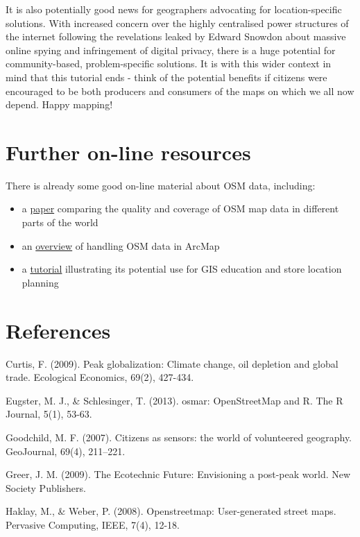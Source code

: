 \documentclass[]{article}
\begin{document}
It is also potentially good news for geographers advocating for
location-specific solutions. With increased concern over the highly
centralised power structures of the internet following the revelations
leaked by Edward Snowdon about massive online spying and infringement of
digital privacy, there is a huge potential for community-based,
problem-specific solutions. It is with this wider context in mind that
this tutorial ends - think of the potential benefits if citizens were
encouraged to be both producers and consumers of the maps on which we
all now depend. Happy mapping!

\section{Further on-line resources}

There is already some good on-line material about OSM data, including:

\begin{itemize}
\item
  a \href{http://www.mdpi.com/1999-5903/5/2/282/pdf}{paper} comparing
  the quality and coverage of OSM map data in different parts of the
  world
\item
  an
  \href{http://www.library.carleton.ca/sites/default/files/help/gis/WorkingWithOpenStreetMap.pdf}{overview}
  of handling OSM data in ArcMap
\item
  a
  \href{http://elogeo.nottingham.ac.uk/xmlui/bitstream/handle/url/289/osm-tutorial-final-2.pdf?sequence=1}{tutorial}
  illustrating its potential use for GIS education and store location
  planning
\end{itemize}
\section{References}

Curtis, F. (2009). Peak globalization: Climate change, oil depletion and
global trade. Ecological Economics, 69(2), 427-434.

Eugster, M. J., \& Schlesinger, T. (2013). osmar: OpenStreetMap and R.
The R Journal, 5(1), 53-63.

Goodchild, M. F. (2007). Citizens as sensors: the world of volunteered
geography. GeoJournal, 69(4), 211--221.

Greer, J. M. (2009). The Ecotechnic Future: Envisioning a post-peak
world. New Society Publishers.

Haklay, M., \& Weber, P. (2008). Openstreetmap: User-generated street
maps. Pervasive Computing, IEEE, 7(4), 12-18.
\end{document}
